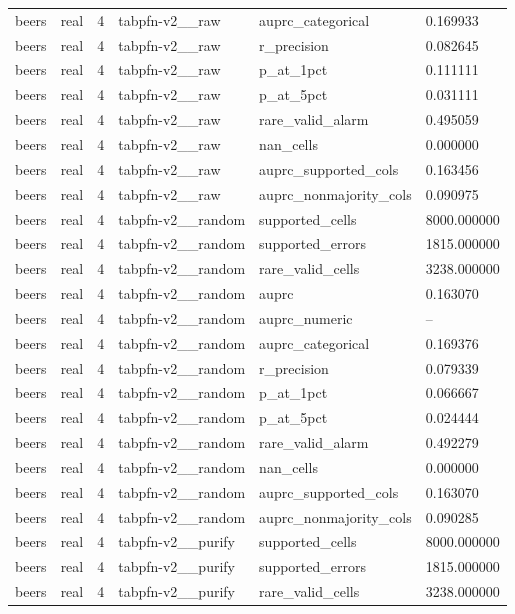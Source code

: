 \begin{tabular}{llllll}
beers & real & 4 & tabpfn-v2\_\_raw & auprc\_categorical & 0.169933 \\
beers & real & 4 & tabpfn-v2\_\_raw & r\_precision & 0.082645 \\
beers & real & 4 & tabpfn-v2\_\_raw & p\_at\_1pct & 0.111111 \\
beers & real & 4 & tabpfn-v2\_\_raw & p\_at\_5pct & 0.031111 \\
beers & real & 4 & tabpfn-v2\_\_raw & rare\_valid\_alarm & 0.495059 \\
beers & real & 4 & tabpfn-v2\_\_raw & nan\_cells & 0.000000 \\
beers & real & 4 & tabpfn-v2\_\_raw & auprc\_supported\_cols & 0.163456 \\
beers & real & 4 & tabpfn-v2\_\_raw & auprc\_nonmajority\_cols & 0.090975 \\
beers & real & 4 & tabpfn-v2\_\_random & supported\_cells & 8000.000000 \\
beers & real & 4 & tabpfn-v2\_\_random & supported\_errors & 1815.000000 \\
beers & real & 4 & tabpfn-v2\_\_random & rare\_valid\_cells & 3238.000000 \\
beers & real & 4 & tabpfn-v2\_\_random & auprc & 0.163070 \\
beers & real & 4 & tabpfn-v2\_\_random & auprc\_numeric & -- \\
beers & real & 4 & tabpfn-v2\_\_random & auprc\_categorical & 0.169376 \\
beers & real & 4 & tabpfn-v2\_\_random & r\_precision & 0.079339 \\
beers & real & 4 & tabpfn-v2\_\_random & p\_at\_1pct & 0.066667 \\
beers & real & 4 & tabpfn-v2\_\_random & p\_at\_5pct & 0.024444 \\
beers & real & 4 & tabpfn-v2\_\_random & rare\_valid\_alarm & 0.492279 \\
beers & real & 4 & tabpfn-v2\_\_random & nan\_cells & 0.000000 \\
beers & real & 4 & tabpfn-v2\_\_random & auprc\_supported\_cols & 0.163070 \\
beers & real & 4 & tabpfn-v2\_\_random & auprc\_nonmajority\_cols & 0.090285 \\
beers & real & 4 & tabpfn-v2\_\_purify & supported\_cells & 8000.000000 \\
beers & real & 4 & tabpfn-v2\_\_purify & supported\_errors & 1815.000000 \\
beers & real & 4 & tabpfn-v2\_\_purify & rare\_valid\_cells & 3238.000000 \\

\end{tabular}
